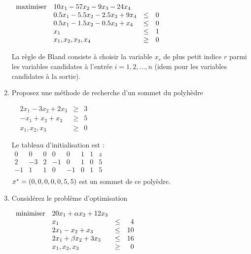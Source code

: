 \begin{enumerate}
    $
    \begin{array}{llcr}
      \mbox{maximiser} & 10 x_1-57 x_2-9x_3-24x_4\\
      & 0.5x_1-5.5x_2-2.5x_3+9x_4 & \leq & 0\\
      & 0.5x_1-1.5x_2-0.5x_3+x_4 & \leq & 0\\
      & x_1 & \leq &1\\
      & x_1, x_2, x_3, x_4 & \geq & 0
    \end{array}
    $


    \begin{solution}
      La règle de Bland consiste à choisir la variable $x_{r}$ de plus petit indice $r$ parmi les variables candidates à l'entrée $i = 1,2, \dots, n$ (idem pour les variables candidates à la sortie). \\
    \end{solution}

  \item Proposez une méthode de recherche d'un sommet du polyhèdre

    $
    \begin{array}{lrcr}
      & 2x_1-3x_2 +2x_3 & \geq & 3\\
      & -x_1+x_2 +x_3 & \geq & 5\\
      & x_1, x_2, x_3 & \geq & 0
    \end{array}
    $

    \begin{solution}
       Le tableau d'initialisation est : \\
       \newline
      $\begin{array}
      {ccccccc|l}
      0&0&0&0&0&1&1&z  \\ \hline
      2&-3&2&-1&0&1&0&5 \\
      -1&1&1&0&-1&0&1&5
      \\\end{array}$\\
      \newline
      \newline
      $x^* = (0,0,0,0,0,5,5)$ est un sommet de ce polyèdre.
    \end{solution}

  \item  Considérez le problème d'optimisation

    $
    \begin{array}{llcr}
      \mbox{minimiser} & 20 x_1+\alpha x_2+12 x_3\\
      & x_1  & \leq & 4\\
      &2x_1 - x_2+x_3 & \leq & 10\\
      &2x_1+\beta x_2+ 3x_3 & \leq & 16\\
      & x_1, x_2, x_3 & \geq & 0
    \end{array}
    $



\end{enumerate}
